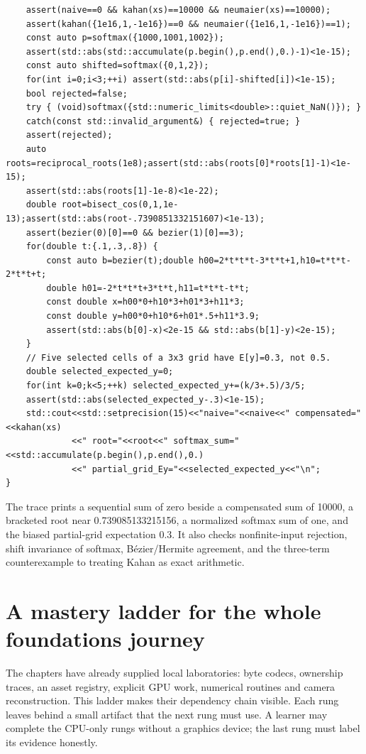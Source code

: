 \begin{verbatim}
    assert(naive==0 && kahan(xs)==10000 && neumaier(xs)==10000);
    assert(kahan({1e16,1,-1e16})==0 && neumaier({1e16,1,-1e16})==1);
    const auto p=softmax({1000,1001,1002});
    assert(std::abs(std::accumulate(p.begin(),p.end(),0.)-1)<1e-15);
    const auto shifted=softmax({0,1,2});
    for(int i=0;i<3;++i) assert(std::abs(p[i]-shifted[i])<1e-15);
    bool rejected=false;
    try { (void)softmax({std::numeric_limits<double>::quiet_NaN()}); }
    catch(const std::invalid_argument&) { rejected=true; }
    assert(rejected);
    auto roots=reciprocal_roots(1e8);assert(std::abs(roots[0]*roots[1]-1)<1e-15);
    assert(std::abs(roots[1]-1e-8)<1e-22);
    double root=bisect_cos(0,1,1e-13);assert(std::abs(root-.7390851332151607)<1e-13);
    assert(bezier(0)[0]==0 && bezier(1)[0]==3);
    for(double t:{.1,.3,.8}) {
        const auto b=bezier(t);double h00=2*t*t*t-3*t*t+1,h10=t*t*t-2*t*t+t;
        double h01=-2*t*t*t+3*t*t,h11=t*t*t-t*t;
        const double x=h00*0+h10*3+h01*3+h11*3;
        const double y=h00*0+h10*6+h01*.5+h11*3.9;
        assert(std::abs(b[0]-x)<2e-15 && std::abs(b[1]-y)<2e-15);
    }
    // Five selected cells of a 3x3 grid have E[y]=0.3, not 0.5.
    double selected_expected_y=0;
    for(int k=0;k<5;++k) selected_expected_y+=(k/3+.5)/3/5;
    assert(std::abs(selected_expected_y-.3)<1e-15);
    std::cout<<std::setprecision(15)<<"naive="<<naive<<" compensated="<<kahan(xs)
             <<" root="<<root<<" softmax_sum="<<std::accumulate(p.begin(),p.end(),0.)
             <<" partial_grid_Ey="<<selected_expected_y<<"\n";
}
\end{verbatim}

The trace prints a sequential sum of zero beside a compensated sum of 10000, a bracketed root near 0.739085133215156, a normalized softmax sum of one, and the biased partial-grid expectation 0.3. It also checks nonfinite-input rejection, shift invariance of softmax, Bézier/Hermite agreement, and the three-term counterexample to treating Kahan as exact arithmetic.

\section{A mastery ladder for the whole foundations journey}\label{02-foundations-ii-ch038-a-mastery-ladder-for-the-whole-foundations-journey}

\hypertarget{02-foundations-ii-ch038-a-mastery-ladder-for-the-whole-foundations-journey}{}

The chapters have already supplied local laboratories: byte codecs, ownership traces, an asset registry, explicit GPU work, numerical routines and camera reconstruction. This ladder makes their dependency chain visible. Each rung leaves behind a small artifact that the next rung must use. A learner may complete the CPU-only rungs without a graphics device; the last rung must label its evidence honestly.

